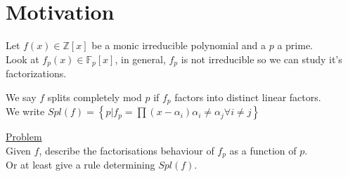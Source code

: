\documentclass[../main.tex]{subfiles}
\begin{document}
\section{Motivation}
Let $f( x) \in \mathbb{Z}[x]$ be a monic irreducible polynomial and a $p$ a prime.\\
Look at $f_p( x) \in \mathbb{F}_p[x]$, in general, $f_p$ is not irreducible so we can study it's factorizations.
\begin{defn}
	We say $f$ splits completely mod $p$ if $f_p$ factors into distinct linear factors.\\
	We write $Spl( f) = \left\{ p | f_p= \prod ( x-\alpha_i) \alpha_i \neq \alpha_j \forall i\neq j  \right\} $ 
\end{defn}
\underline{Problem}\\
Given $f$, describe the factorisations behaviour of $f_p$ as a function of $p$.\\
Or at least give a rule determining $Spl( f) $.\\
\end{document}
